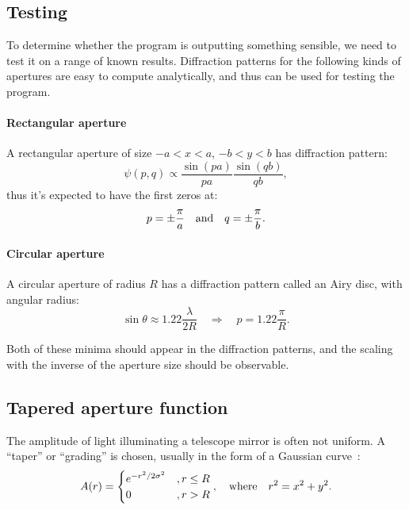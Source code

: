 \documentclass{article}
\begin{document}
\subsection{Testing}\label{sec:analysis:test}
To determine whether the program is outputting something sensible, we need to test it on a range of known results. Diffraction patterns for the following kinds of apertures are easy to compute analytically, and thus can be used for testing the program.

\paragraph{Rectangular aperture} A rectangular aperture of size $-a < x < a$, $-b < y < b$ has diffraction pattern:
\begin{equation}
    \psi(p, q) \propto \frac{\sin{\left( pa \right)}}{pa} \frac{\sin{\left( qb \right)}}{qb},
\end{equation}
thus it's expected to have the first zeros at:
\begin{equation}\label{eqn:test_rect}
    p = \pm \frac{\pi}{a} \qq{and} q = \pm \frac{\pi}{b}.
\end{equation}

\paragraph{Circular aperture} A circular aperture of radius $R$ has a diffraction pattern called an Airy disc, with angular radius:
\begin{equation}\label{eqn:test_circ}
    \sin{\theta} \approx 1.22 \frac{\lambda}{2R} \quad \Rightarrow \quad p = 1.22 \frac{\pi}{R}.
\end{equation}

Both of these minima should appear in the diffraction patterns, and the scaling with the inverse of the aperture size should be observable.

\subsection{Tapered aperture function}\label{sec:analysis:taper}
The amplitude of light illuminating a telescope mirror is often not uniform. A ``taper'' or ``grading'' is chosen, usually in the form of a Gaussian curve~\cite[Section~6.4]{RadioAstro}:
\begin{equation}
    A(r) = \begin{cases}
        e ^ {-r^2 / {2 \sigma^2}} &, r \leq R\\
        0 &, r > R
    \end{cases}, \qq{where} r^2 = x^2 + y^2.
\end{equation}
\end{document}

